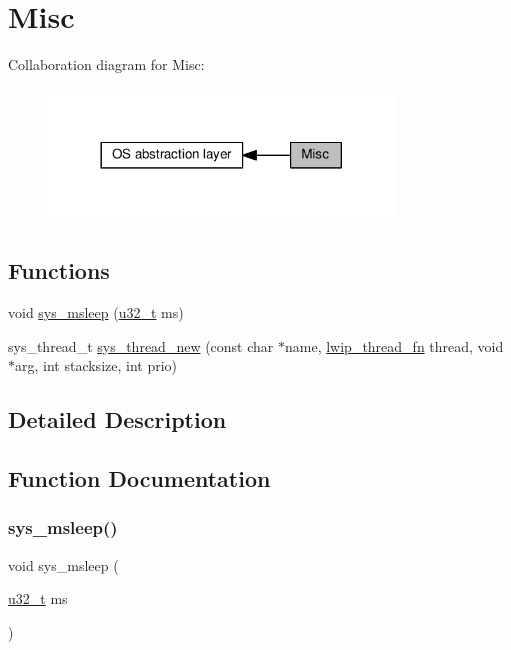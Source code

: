 \hypertarget{group__sys__misc}{}\section{Misc}
\label{group__sys__misc}
Collaboration diagram for Misc\+:
\nopagebreak
\begin{figure}[H]
\begin{center}
\leavevmode
\includegraphics[width=260pt]{group__sys__misc}
\end{center}
\end{figure}
\subsection*{Functions}
\begin{DoxyCompactItemize}
\item 
void \hyperlink{group__sys__misc_ga6b8786f43e779953e8b74e983c88682e}{sys\+\_\+msleep} (\hyperlink{group__compiler__abstraction_ga4c14294869aceba3ef9d4c0c302d0f33}{u32\+\_\+t} ms)
\item 
sys\+\_\+thread\+\_\+t \hyperlink{group__sys__misc_ga0d596afdd8dbcfad320172d39b0f607a}{sys\+\_\+thread\+\_\+new} (const char $\ast$name, \hyperlink{openmote-cc2538_2lwip_2src_2include_2lwip_2sys_8h_ae30a77bf6bd69bfcc5f235eaad54f2b9}{lwip\+\_\+thread\+\_\+fn} thread, void $\ast$arg, int stacksize, int prio)
\end{DoxyCompactItemize}


\subsection{Detailed Description}


\subsection{Function Documentation}
\mbox{\label{group__sys__misc_ga6b8786f43e779953e8b74e983c88682e}} 
\subsubsection{\texorpdfstring{sys\+\_\+msleep()}{sys\_msleep()}}
{\footnotesize\ttfamily void sys\+\_\+msleep (\begin{DoxyParamCaption}\item[{\hyperlink{group__compiler__abstraction_ga4c14294869aceba3ef9d4c0c302d0f33}{u32\+\_\+t}}]{ms }\end{DoxyParamCaption})}

